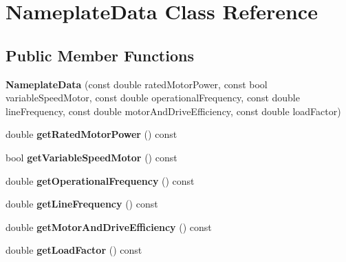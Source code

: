\hypertarget{class_nameplate_data}{}\section{Nameplate\+Data Class Reference}
\label{class_nameplate_data}
\subsection*{Public Member Functions}
\begin{DoxyCompactItemize}
\item 
\mbox{\label{class_nameplate_data_a6958626d3d824cdffb7080c13f5bf1e6}} 
{\bfseries Nameplate\+Data} (const double rated\+Motor\+Power, const bool variable\+Speed\+Motor, const double operational\+Frequency, const double line\+Frequency, const double motor\+And\+Drive\+Efficiency, const double load\+Factor)
\item 
\mbox{\label{class_nameplate_data_a3506a38071eefa609103cd459c187423}} 
double {\bfseries get\+Rated\+Motor\+Power} () const
\item 
\mbox{\label{class_nameplate_data_abc4cb0dd430590e9d522bebb35613af2}} 
bool {\bfseries get\+Variable\+Speed\+Motor} () const
\item 
\mbox{\label{class_nameplate_data_a1cbccaaae346895abb0a95533b59d694}} 
double {\bfseries get\+Operational\+Frequency} () const
\item 
\mbox{\label{class_nameplate_data_af53b826d879b72f1108e60a49bab9174}} 
double {\bfseries get\+Line\+Frequency} () const
\item 
\mbox{\label{class_nameplate_data_ab067dcdcd77bb824a4f7d406c35165b5}} 
double {\bfseries get\+Motor\+And\+Drive\+Efficiency} () const
\item 
\mbox{\label{class_nameplate_data_aa0e7f69bd390f0f763d0de71dde08c1b}} 
double {\bfseries get\+Load\+Factor} () const
\item 
\mbox{\label{class_nameplate_data_a75169688de937aa3cfc6b4720ffd012a}} 

\end{DoxyCompactItemize}
